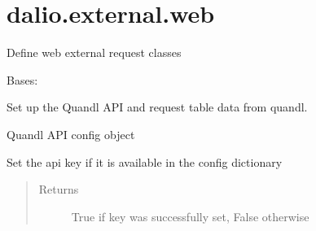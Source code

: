 \documentclass[letterpaper,10pt,english]{sphinxmanual}
\begin{document}
\section{dalio.external.web}
\label{\detokenize{dalio.external:module-dalio.external.web}}\label{\detokenize{dalio.external:dalio-external-web}}
Define web external request classes

\begin{fulllineitems}
\label{\detokenize{dalio.external:dalio.external.web.QuandlAPI}}
Bases: {\hyperref[\detokenize{dalio.external:dalio.external.external.External}]{}}

Set up the Quandl API and request table data from quandl.

\begin{fulllineitems}
\label{\detokenize{dalio.external:dalio.external.web.QuandlAPI._quandl_conf}}
Quandl API config object

\end{fulllineitems}


\begin{fulllineitems}
\label{\detokenize{dalio.external:dalio.external.web.QuandlAPI.authenticate}}
Set the api key if it is available in the config dictionary
\begin{quote}\begin{description}
\item[{Returns}] \leavevmode
True if key was successfully set, False otherwise

\end{description}\end{quote}

\end{fulllineitems}


\end{fulllineitems}
\end{document}
